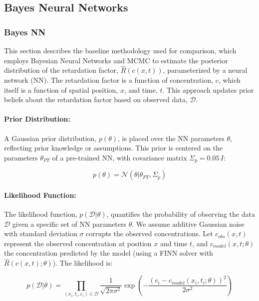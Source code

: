 \subsection{Bayes Neural Networks}
\subsubsection{Bayes NN}
\label{sec:bayes_nn}
This section describes the baseline methodology used for comparison, which employs Bayesian Neural Networks and MCMC to estimate the posterior distribution of the retardation factor, $\hat{R}(c(x,t))$, parameterized by a neural network (NN). The retardation factor is a function of concentration, $c$, which itself is a function of spatial position, $x$, and time, $t$. This approach updates prior beliefs about the retardation factor based on observed data, $\mathcal{D}$.

\paragraph{Prior Distribution:}

A Gaussian prior distribution, $p(\theta)$, is placed over the NN parameters $\theta$, reflecting prior knowledge or assumptions. This prior is centered on the parameters $\theta_{PT}$ of a pre-trained NN, with covariance matrix $\Sigma_p = 0.05 \, I$:


\begin{equation*}
p(\theta) = \mathcal{N}(\theta | \theta_{PT}, \Sigma_p)
\end{equation*}

\paragraph{Likelihood Function:}

The likelihood function, $p(\mathcal{D} | \theta)$, quantifies the probability of observing the data $\mathcal{D}$ given a specific set of NN parameters $\theta$. We assume additive Gaussian noise with standard deviation $\sigma$ corrupts the observed concentrations. Let $c_{obs}(x,t)$ represent the observed concentration at position $x$ and time $t$, and $c_{model}(x,t; \theta)$ the concentration predicted by the model (using a FINN solver with $\hat{R}(c(x,t);\theta)$). The likelihood is:

\begin{equation}
p(\mathcal{D} | \theta) = \prod_{(x_i, t_i, c_i) \in \mathcal{D}} \frac{1}{\sqrt{2\pi \sigma^2}} \exp \left( -\frac{(c_i - c_{model}(x_i, t_i; \theta))^2}{2\sigma^2} \right)
\label{eq:likelihood}
\end{equation}

